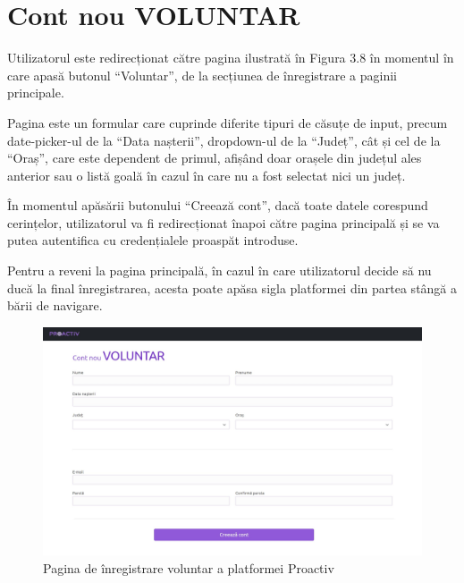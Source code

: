 \documentclass[12pt,a4paper]{report}
\begin{document}
\section{Cont nou VOLUNTAR}
\par
Utilizatorul este redirecționat către pagina ilustrată în Figura 3.8 în momentul în care apasă butonul “Voluntar”, de la secțiunea de înregistrare a paginii principale.
\\\par
Pagina este un formular care cuprinde diferite tipuri de căsuțe de input, precum date-picker-ul de la “Data nașterii”, dropdown-ul de la “Județ”, cât și cel de la “Oraș”, care este dependent de primul, afișând doar orașele din județul ales anterior sau o listă goală în cazul în care nu a fost selectat nici un județ.
\\\par
În momentul apăsării butonului “Creează cont”, dacă toate datele corespund cerințelor, utilizatorul va fi redirecționat înapoi către pagina principală și se va putea autentifica cu credențialele proaspăt introduse.
\\\par
Pentru a reveni la pagina principală, în cazul în care utilizatorul decide să nu ducă la final înregistrarea, acesta poate apăsa sigla platformei din partea stângă a bării de navigare.
\\
\begin{figure}[H]
\centering
  \includegraphics[width=1\linewidth]{./imagini/contvol.jpg}
  \caption{Pagina de înregistrare voluntar a platformei Proactiv}
\end{figure}
\end{document}
